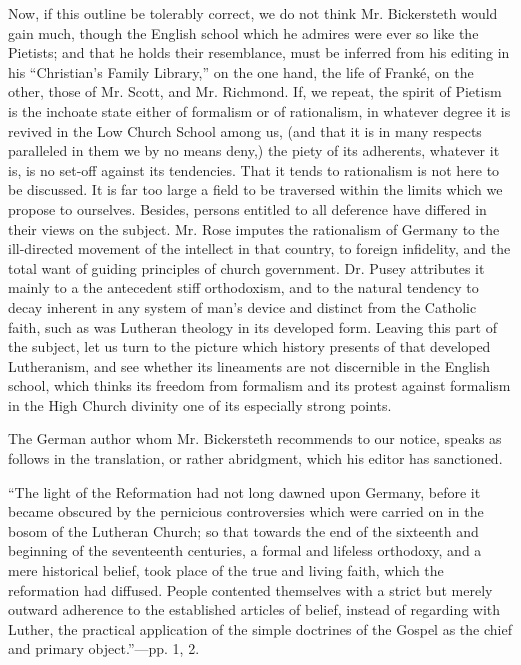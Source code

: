 Now, if this outline be tolerably correct, we do
not think Mr. Bickersteth would gain much, though the English school
which he admires were ever so like the Pietists; and that he holds their
resemblance, must be inferred from his editing in his ``Christian's
Family Library,'' on the one hand, the life of Franké, on the other, those of Mr. Scott, and Mr. Richmond. If, we repeat, the spirit
of Pietism is the inchoate state either of formalism or of rationalism,
in whatever degree it is revived in the Low Church School among us, (and
that it is in many respects paralleled in them we by no means deny,) the
piety of its adherents, whatever it is, is no set-off against its
tendencies. That it tends to rationalism is not here to be discussed. It
is far too large a field to be traversed within the limits which we
propose to ourselves. Besides, persons entitled to all deference have
differed in their views on the subject. Mr. Rose imputes the rationalism
of Germany to the ill-directed movement of the intellect in that
country, to foreign infidelity, and the total want of guiding principles
of church government. Dr. Pusey attributes it mainly to a the antecedent
stiff orthodoxism, and to the natural tendency to decay inherent in any
system of man's device and distinct from the Catholic faith, such as was
Lutheran theology in its developed form. Leaving this part of the
subject, let us turn to the picture which history presents of that
developed Lutheranism, and see whether its lineaments are not
discernible in the English school, which thinks its freedom from
formalism and its protest against formalism in the High Church divinity
one of its especially strong points.

The German author whom Mr. Bickersteth recommends
to our notice, speaks as follows in the translation, or rather
abridgment, which his editor has sanctioned.

``The light of the Reformation had
not long dawned upon Germany, before it became obscured by the
pernicious controversies which were carried on in the bosom of the
Lutheran Church; so that towards the end of the sixteenth and beginning
of the seventeenth centuries, a formal and lifeless orthodoxy, and a
mere historical belief, took place of the true and living faith, which
the reformation had diffused. People contented themselves with a strict
but merely outward adherence to the established articles of belief,
instead of regarding with Luther, the practical application of the
simple doctrines of the Gospel as the chief and primary object.''—pp.
1, 2.

